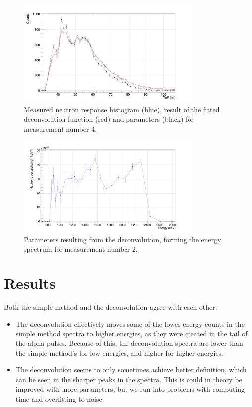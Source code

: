 \documentclass[a4paper,12pt]{report}
\begin{document}
\begin{figure}[H]
	\centering
	\includegraphics[width=0.80\textwidth]{pulsed_deconvolution_delta.png}
	\caption{Measured neutron response histogram (blue), result of the fitted deconvolution function (red) and parameters (black) for measurement number 4.}
	\label{pulsed_deconvolution_delta}
\end{figure}

\begin{figure}[H]
	\centering
	\includegraphics[width=0.80\textwidth]{pulsed_deconvolution.png}
	\caption{Parameters resulting from the deconvolution, forming the energy spectrum for measurement number 2.}
	\label{pulsed_deconvolution}
\end{figure}

\section{Results}
Both the simple method and the deconvolution agree with each other:
\begin{itemize}
	\item The deconvolution effectively moves some of the lower energy counts in the simple method spectra to higher energies, as they were created in the tail of the alpha pulses.
		Because of this, the deconvolution spectra are lower than the simple method's for low energies, and higher for higher energies.
	\item The deconvolution seems to only sometimes achieve better definition, which can be seen in the sharper peaks in the spectra.
		This is could in theory be improved with more parameters, but we run into problems with computing time and overfitting to noise.
\end{itemize}
\end{document}

